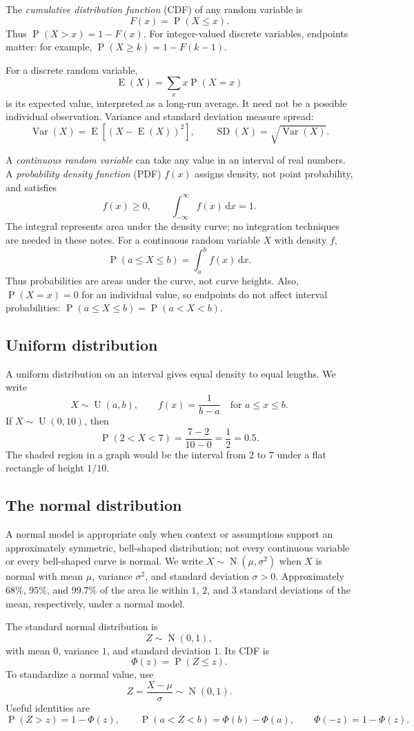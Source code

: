 \documentclass[11pt]{article}
\newcommand{\Pp}{\operatorname{P}}
\newcommand{\E}{\operatorname{E}}
\newcommand{\Var}{\operatorname{Var}}
\newcommand{\SD}{\operatorname{SD}}
\newcommand{\N}{\operatorname{N}}
\newcommand{\Unif}{\operatorname{U}}
\newcommand{\dd}{\,\mathrm{d}}
\begin{document}
The \emph{cumulative distribution function} (CDF) of any random variable is
\[
F(x)=\Pp(X\leq x).
\]
Thus $\Pp(X>x)=1-F(x)$.  For integer-valued discrete variables, endpoints matter:
for example, $\Pp(X\geq k)=1-F(k-1)$.

For a discrete random variable,
\[
\E(X)=\sum_x x\Pp(X=x)
\]
is its expected value, interpreted as a long-run average.  It need not be a
possible individual observation.  Variance and standard deviation measure spread:
\[
\Var(X)=\E\!\left[(X-\E(X))^2\right],
\qquad
\SD(X)=\sqrt{\Var(X)}.
\]

A \emph{continuous random variable} can take any value in an interval of real
numbers.  A \emph{probability density function} (PDF) $f(x)$ assigns density,
not point probability, and satisfies
\[
f(x)\geq0,
\qquad
\int_{-\infty}^{\infty} f(x)\dd x=1.
\]
The integral represents area under the density curve; no integration techniques
are needed in these notes.  For a continuous random variable $X$ with density
$f$,
\[
\Pp(a\leq X\leq b)=\int_a^b f(x)\dd x.
\]
Thus probabilities are areas under the curve, not curve heights.  Also,
$\Pp(X=x)=0$ for an individual value, so endpoints do not affect interval
probabilities: $\Pp(a\leq X\leq b)=\Pp(a<X<b)$.

\subsection{Uniform distribution}
A uniform distribution on an interval gives equal density to equal lengths.  We
write
\[
X\sim \Unif(a,b),\qquad f(x)=\frac{1}{b-a}\quad\text{for }a\leq x\leq b.
\]
If $X\sim\Unif(0,10)$, then
\[
\Pp(2<X<7)=\frac{7-2}{10-0}=\frac12=0.5.
\]
The shaded region in a graph would be the interval from $2$ to $7$ under a flat
rectangle of height $1/10$.

\subsection{The normal distribution}
A normal model is appropriate only when context or assumptions support an
approximately symmetric, bell-shaped distribution; not every continuous variable
or every bell-shaped curve is normal.  We write
$X\sim \N(\mu,\sigma^2)$ when $X$ is normal with mean $\mu$, variance
$\sigma^2$, and standard deviation $\sigma>0$.  Approximately $68\%$, $95\%$,
and $99.7\%$ of the area lie within $1$, $2$, and $3$ standard deviations of
the mean, respectively, under a normal model.

The standard normal distribution is
\[
Z\sim \N(0,1),
\]
with mean $0$, variance $1$, and standard deviation $1$.  Its CDF is
\[
\Phi(z)=\Pp(Z\leq z).
\]
To standardize a normal value, use
\[
Z=\frac{X-\mu}{\sigma}\sim\N(0,1).
\]
Useful identities are
\[
\Pp(Z>z)=1-\Phi(z),\qquad
\Pp(a<Z<b)=\Phi(b)-\Phi(a),\qquad
\Phi(-z)=1-\Phi(z).
\]
\end{document}
